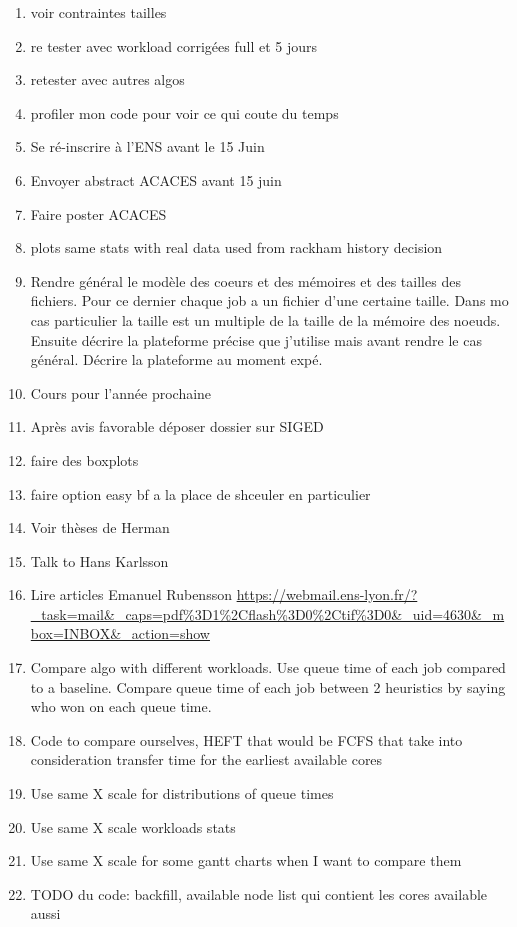 \documentclass[a4paper]{article}
\begin{document}
\begin{enumerate}
		
			\item voir contraintes tailles
			\item re tester avec workload corrigées full et 5 jours
			\item retester avec autres algos
			\item profiler mon code pour voir ce qui coute du temps
			\item Se ré-inscrire à l'ENS avant le 15 Juin
			\item Envoyer abstract ACACES avant 15 juin
			\item Faire poster ACACES
			\item plots same stats with real data used from rackham history decision
			\item Rendre général le modèle des coeurs et des mémoires et des tailles des fichiers. Pour ce dernier chaque job a un fichier d'une certaine taille. Dans mo cas particulier la taille est un multiple de la taille de la mémoire des noeuds. Ensuite décrire la plateforme précise que j'utilise mais avant rendre le cas général. Décrire la plateforme au moment expé.
			\item Cours pour l'année prochaine
			\item Après avis favorable déposer dossier sur SIGED
			\item faire des boxplots
			\item faire option easy bf a la place de shceuler en particulier
			\item Voir thèses de Herman
			\item Talk to Hans Karlsson
			\item Lire articles Emanuel Rubensson \url{https://webmail.ens-lyon.fr/?_task=mail&_caps=pdf%3D1%2Cflash%3D0%2Ctif%3D0&_uid=4630&_mbox=INBOX&_action=show}
			\item Compare algo with different workloads. Use queue time of each job compared to a baseline. Compare queue time of each job between 2 heuristics by saying who won on each queue time.
			\item Code to compare ourselves, HEFT that would be FCFS that take into consideration transfer time for the earliest available cores
			\item Use same X scale for distributions of queue times
			\item Use same X scale workloads stats
			\item Use same X scale for some gantt charts when I want to compare them
			\item TODO du code: backfill, available node list qui contient les cores available aussi

\end{enumerate}
\end{document}
